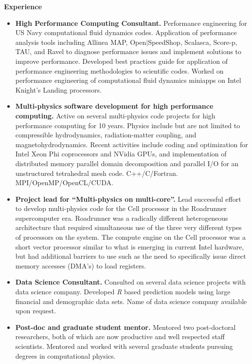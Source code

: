{\noindent\bf Experience}

\begin{itemize}
\item {\bf High Performance Computing Consultant.} Performance engineering
for US Navy computational fluid dynamics codes. Application of performance
analysis tools including Allinea MAP, Open$|$SpeedShop, Scalasca, Score-p, TAU,
and Ravel to diagnose performance issues and implement solutions to improve
performance. Developed best practices guide for application of performance
engineering methodologies to scientific codes. Worked on performance
engineering of computational fluid dynamics miniapps on Intel Knight's
Landing processors.
\item {\bf Multi-physics software development for high performance
  computing.} Active on several multi-physics code projects for high
performance computing for 10 years. Physics include but are not
limited to compressible hydrodynamics, radiation-matter coupling, and
magnetohydrodynamics. Recent
activities include coding and optimization for Intel Xeon Phi
coprocessors and NVidia GPUs, and implementation of distributed memory
parallel domain decomposition and parallel
I/O for an unstructured tetrahedral mesh
code. C++/C/Fortran. MPI/OpenMP/OpenCL/CUDA. 
\item {\bf Project lead for ``Multi-physics on multi-core''.} Lead
  successful effort to develop multi-physics code for the Cell
  processor in the Roadrunner supercomputer era. Roadrunner was a
  radically different heterogeneous architecture that required
  simultaneous use of the three very different types of processors on
  the system. The compute engine on the Cell processor was a short
  vector processor similar to what is emerging in current Intel
  hardware, but had additional barriers to use such as the need to
  specifically issue direct memory accesses (DMA's) to load
  registers.
\item {\bf Data Science Consultant.} Consulted on several data science
  projects with data science company. Developed {\em R} based
  prediction models using large financial and demographic data
  sets. Name of data science company available upon request.
\item {\bf Post-doc and graduate student mentor.} Mentored two
  post-doctoral researchers, both of which are now productive and well
  respected staff scientists. Mentored and worked with several
  graduate students pursuing degrees in computational physics.
\end{itemize}